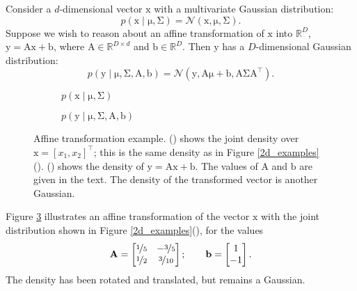 \documentclass{article}
\newcommand{\given}{\mid}
\newcommand{\mc}[1]{\mathcal{#1}}
\newcommand{\trans}{^\top}
\newcommand{\mat}[1]{\bm{\mathrm{#1}}}
\renewcommand{\vec}[1]{\bm{\mathrm{#1}}}
\newcommand{\R}{\mathbb{R}}
\begin{document}
Consider a $d$-dimensional vector $\vec{x}$ with a multivariate
Gaussian distribution:
\begin{equation*}
  p(\vec{x} \given \vec{\mu}, \mat{\Sigma})
  =
  \mc{N}(\vec{x}, \vec{\mu}, \mat{\Sigma}).
\end{equation*}
Suppose we wish to reason about an affine transformation of $\vec{x}$
into $\R^D$, $\vec{y} = \mat{A}\vec{x} + \vec{b}$, where $\mat{A} \in
\R^{D \times d}$ and $\vec{b} \in \R^D$.  Then $\vec{y}$ has a
$D$-dimensional Gaussian distribution:
\begin{equation*}
  p(\vec{y} \given \vec{\mu}, \mat{\Sigma}, \mat{A}, \vec{b})
  =
  \mc{N}(\vec{y}, \mat{A}\vec{\mu} + \vec{b}, \mat{A}\mat{\Sigma}\mat{A}\trans).
\end{equation*}

\begin{figure}
  \centering
  \begin{subfigure}[t]{0.49\textwidth}
    
    \caption{$p(\vec{x} \given \vec{\mu}, \mat{\Sigma})$}
    \label{transformed_2d_pdf}
  \end{subfigure}
  \begin{subfigure}[t]{0.49\textwidth}
    
    \caption{$p(\vec{y} \given \vec{\mu}, \mat{\Sigma}, \mat{A}, \vec{b})$}
    \label{transformed_pdf}
  \end{subfigure}
  \caption{Affine transformation example.
    () shows the joint density over
    $\vec{x} = [x_1, x_2]\trans$; this is the same density as in
    Figure \ref{2d_examples}().
    () shows the density of $\vec{y} =
    \mat{A}\vec{x} + \vec{b}$. The values of $\mat{A}$ and $\vec{b}$
    are given in the text.  The density of the transformed vector is
    another Gaussian.}
  \label{transformed_example}
\end{figure}

Figure \ref{transformed_example} illustrates an affine transformation
of the vector $\vec{x}$ with the joint distribution shown in Figure
\ref{2d_examples}(), for the values
\begin{equation*}
  \mat{A}
  =
  \begin{bmatrix}
    \nicefrac{1}{5} & -\nicefrac{3}{5} \\
    \nicefrac{1}{2} & \nicefrac{3}{10}
  \end{bmatrix};
  \qquad
  \vec{b}
  =
  \begin{bmatrix}
    1 \\
    -1
  \end{bmatrix}.
\end{equation*}
The density has been rotated and translated, but remains a Gaussian.
\end{document}
